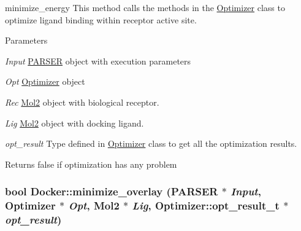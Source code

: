 minimize\_\-energy This method calls the methods in the \hyperlink{classOptimizer}{Optimizer} class to optimize ligand binding within receptor active site. 
\begin{DoxyParams}{Parameters}
\item[{\em Input}]\hyperlink{classPARSER}{PARSER} object with execution parameters \item[{\em Opt}]\hyperlink{classOptimizer}{Optimizer} object \item[{\em Rec}]\hyperlink{classMol2}{Mol2} object with biological receptor. \item[{\em Lig}]\hyperlink{classMol2}{Mol2} object with docking ligand. \item[{\em opt\_\-result}]Type defined in \hyperlink{classOptimizer}{Optimizer} class to get all the optimization results. \end{DoxyParams}
\begin{DoxyReturn}{Returns}
false if optimization has any problem 
\end{DoxyReturn}
\hypertarget{classDocker_a834f5873f6b323033b5060e46e20b4f9}{
\subsubsection[{minimize\_\-overlay}]{\setlength{\rightskip}{0pt plus 5cm}bool Docker::minimize\_\-overlay ({\bf PARSER} $\ast$ {\em Input}, \/  {\bf Optimizer} $\ast$ {\em Opt}, \/  {\bf Mol2} $\ast$ {\em Lig}, \/  {\bf Optimizer::opt\_\-result\_\-t} $\ast$ {\em opt\_\-result})}}
\label{classDocker_a834f5873f6b323033b5060e46e20b4f9}


